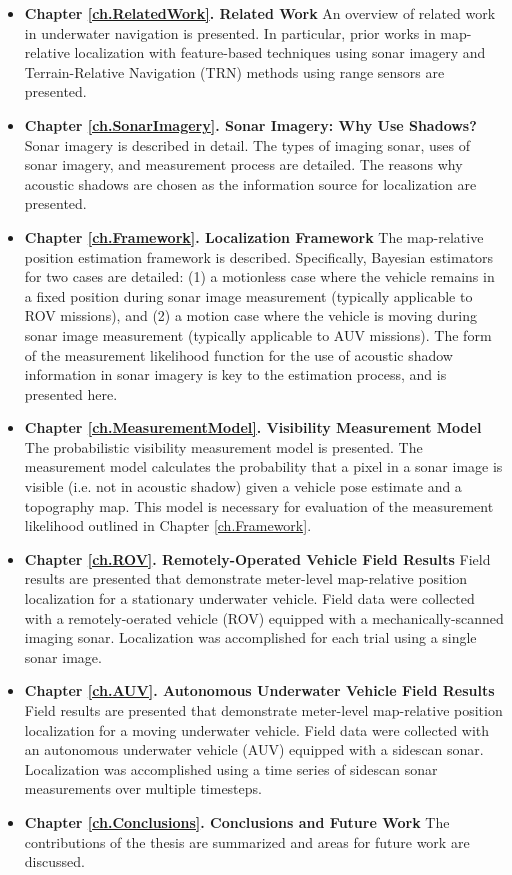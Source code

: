 \begin{itemize}
  \item \textbf{Chapter \ref{ch.RelatedWork}. Related Work} An overview of related work in underwater navigation is presented.  In particular, prior works in map-relative localization with feature-based techniques using sonar imagery and Terrain-Relative Navigation (TRN) methods using range sensors are presented.
  \item \textbf{Chapter \ref{ch.SonarImagery}. Sonar Imagery: Why Use Shadows?} Sonar imagery is described in detail.  The types of imaging sonar, uses of sonar imagery, and measurement process are detailed.  The reasons why acoustic shadows are chosen as the information source for localization are presented.
  \item \textbf{Chapter \ref{ch.Framework}. Localization Framework} The map-relative position estimation framework is described.  Specifically, Bayesian estimators for two cases are detailed: (1) a motionless case where the vehicle remains in a fixed position during sonar image measurement (typically applicable to ROV missions), and (2) a motion case where the vehicle is moving during sonar image measurement (typically applicable to AUV missions).  The form of the measurement likelihood function for the use of acoustic shadow information in sonar imagery is key to the estimation process, and is presented here.
  \item \textbf{Chapter \ref{ch.MeasurementModel}. Visibility Measurement Model} The probabilistic visibility measurement model is presented.  The measurement model calculates the probability that a pixel in a sonar image is visible (i.e. not in acoustic shadow) given a vehicle pose estimate and a topography map.  This model is necessary for evaluation of the measurement likelihood outlined in Chapter \ref{ch.Framework}.
  \item \textbf{Chapter \ref{ch.ROV}. Remotely-Operated Vehicle Field Results} Field results are presented that demonstrate meter-level map-relative position localization for a stationary underwater vehicle.  Field data were collected with a remotely-oerated vehicle (ROV) equipped with a mechanically-scanned imaging sonar.  Localization was accomplished for each trial using a single sonar image.
  \item \textbf{Chapter \ref{ch.AUV}. Autonomous Underwater Vehicle Field Results} Field results are presented that demonstrate meter-level map-relative position localization for a moving underwater vehicle.  Field data were collected with an autonomous underwater vehicle (AUV) equipped with a sidescan sonar.  Localization was accomplished using a time series of sidescan sonar measurements over multiple timesteps.
  \item \textbf{Chapter \ref{ch.Conclusions}. Conclusions and Future Work} The contributions of the thesis are summarized and areas for future work are discussed.
\end{itemize}

